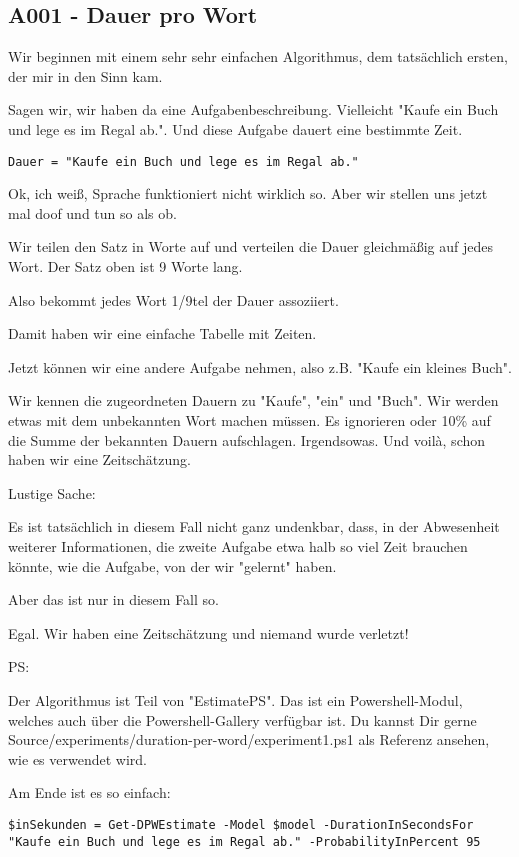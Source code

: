\newpage{}

\subsection{A001 - Dauer pro Wort}

Wir beginnen mit einem sehr sehr einfachen Algorithmus, dem tatsächlich ersten, 
der mir in den Sinn kam.

Sagen wir, wir haben da eine Aufgabenbeschreibung. Vielleicht "Kaufe ein Buch
und lege es im Regal ab.". Und diese Aufgabe dauert eine bestimmte Zeit.

\begin{verbatim}
Dauer = "Kaufe ein Buch und lege es im Regal ab."
\end{verbatim}

Ok, ich weiß, Sprache funktioniert nicht wirklich so. 
Aber wir stellen uns jetzt mal doof und tun so als ob.
 
Wir teilen den Satz in Worte auf und 
verteilen die Dauer gleichmäßig auf jedes Wort. Der Satz oben ist 9 Worte lang.

Also bekommt jedes Wort 1/9tel der Dauer assoziiert.

Damit haben wir eine einfache Tabelle mit Zeiten.

Jetzt können wir eine andere Aufgabe nehmen, also z.B. "Kaufe ein kleines Buch".

Wir kennen die zugeordneten Dauern zu "Kaufe", "ein" und "Buch". Wir 
werden etwas mit dem unbekannten Wort machen müssen. Es ignorieren oder 10\%
auf die Summe der bekannten Dauern aufschlagen. Irgendsowas. Und voilà, 
schon haben wir eine Zeitschätzung.

Lustige Sache:

Es ist tatsächlich in diesem Fall nicht ganz undenkbar, dass, in der Abwesenheit
weiterer Informationen, die zweite Aufgabe etwa halb so viel Zeit brauchen
könnte, wie die Aufgabe, von der wir "gelernt" haben.

Aber das ist nur in diesem Fall so. 

Egal. Wir haben eine Zeitschätzung und niemand wurde verletzt!

PS:

Der Algorithmus ist Teil von "EstimatePS". Das ist ein Powershell-Modul, 
welches auch über die Powershell-Gallery verfügbar ist.
Du kannst Dir gerne Source/experiments/duration-per-word/experiment1.ps1 als 
Referenz ansehen, wie es verwendet wird.

Am Ende ist es so einfach:

\begin{verbatim}
$inSekunden = Get-DPWEstimate -Model $model -DurationInSecondsFor "Kaufe ein Buch und lege es im Regal ab." -ProbabilityInPercent 95
\end{verbatim}

